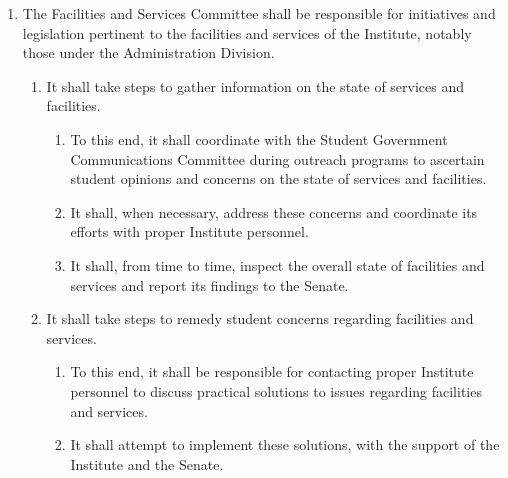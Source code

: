 \documentclass{bylaws}
\begin{document}
\begin{enumerate}
\item The Facilities and Services Committee shall be responsible for initiatives and legislation pertinent to the facilities and services
of the Institute, notably those under the Administration Division.
\begin{enumerate}
\item It shall take steps to gather information on the state of services and facilities.
\begin{enumerate}
\item To this end, it shall coordinate with the Student Government Communications Committee during outreach programs to
ascertain student opinions and concerns on the state of services and facilities.
\item It shall, when necessary, address these concerns and coordinate its efforts with proper Institute personnel.
\item It shall, from time to time, inspect the overall state of facilities and services and report its findings to the Senate.
\end{enumerate}

\item It shall take steps to remedy student concerns regarding facilities and services.
\begin{enumerate}
\item To this end, it shall be responsible for contacting proper Institute personnel to discuss practical solutions to issues
regarding facilities and services.
\item It shall attempt to implement these solutions, with the support of the Institute and the Senate.
\end{enumerate}
\end{enumerate}


\end{enumerate}
\end{document}
